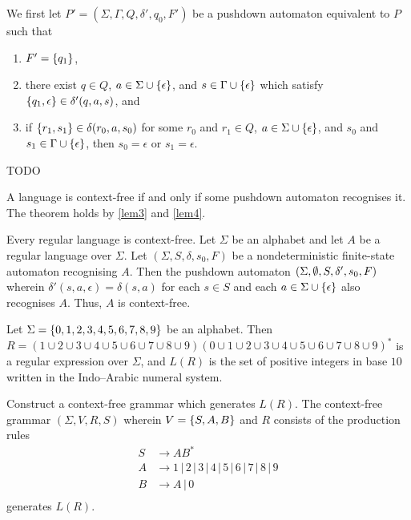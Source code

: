     We first let \(P' = (\Sigma, \Gamma, Q, \delta', q_0, F')\) be a pushdown
    automaton equivalent to \(P\) such that
    \begin{enumerate}
        \item \(F' = \{q_1\}\),
        \item there exist \(q \in Q\), \(a \in \Sigma \cup \{\epsilon\}\), and
        \(s \in \Gamma \cup \{\epsilon\}\) which satisfy \(\{q_1, \epsilon\}
        \in \delta'(q, a, s)\), and
        \item if \(\{r_1, s_1\} \in \delta(r_0, a, s_0)\) for some \(r_0\) and
        \(r_1 \in Q\), \(a \in \Sigma \cup \{\epsilon\}\), and \(s_0\) and
        \(s_1 \in \Gamma \cup \{\epsilon\}\), then \(s_0 = \epsilon\) or \(s_1
        = \epsilon\).
    \end{enumerate}

    TODO
\Epr

\Bth
    A language is context-free if and only if some pushdown automaton recognises
    it.
\Eth
\Bpr
    The theorem holds by \autoref{lem3} and \autoref{lem4}.
\Epr

\Bcr
    Every regular language is context-free.
\Ecr
\Bpr
    Let \(\Sigma\) be an alphabet and let \(A\) be a regular language over
    \(\Sigma\). Let \((\Sigma, S, \delta, s_0, F)\) be a nondeterministic
    finite-state automaton recognising \(A\). Then the pushdown automaton
    \((\Sigma, \emptyset, S, \delta', s_0, F)\) wherein \(\delta'(s, a, \epsilon) =
    \delta(s, a)\) for each \(s \in S\) and each \(a \in \Sigma \cup
    \{\epsilon\}\) also recognises \(A\). Thus, \(A\) is context-free.
\Epr

\Bxr
    Let \(\Sigma = \{0, 1, 2, 3, 4, 5, 6, 7, 8, 9\}\) be an alphabet. Then \(R
    = (1 \cup 2 \cup 3 \cup 4 \cup 5 \cup 6 \cup 7 \cup 8 \cup 9) (0 \cup 1 \cup
    2 \cup 3 \cup 4 \cup 5 \cup 6 \cup 7 \cup 8 \cup 9)^*\) is a regular
    expression over \(\Sigma\), and \(L(R)\) is the set of positive integers in
    base \(10\) written in the Indo--Arabic numeral system.

    Construct a context-free grammar which generates \(L(R)\).
\Exr
\Bsl
    The context-free grammar \((\Sigma, V, R, S)\) wherein \(V = \{S, A, B\}\)
    and \(R\) consists of the production rules
    \begin{align*}
        S & \to A B^*\\
        A & \to 1 \, | \, 2 \, | \, 3 \, | \, 4 \, | \, 5 \, | \, 6 \, | \, 7 \,
        | \, 8 \, | \, 9\\
        B & \to A \, | \, 0\\
    \end{align*}
    generates \(L(R)\).
\Esl

